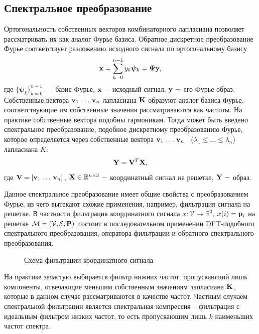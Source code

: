\subsection{Спектральное преобразование}

Ортогональность собственных векторов комбинаторного лапласиана позволяет рассматривать их как аналог Фурье базиса.  Обратное дискретное преобразование Фурье соответствует разложению исходного сигнала по ортогональному базису 
	$$\textbf{x} = \sum \limits _{k=0}^{n-1} y_k \bm{\psi}_k = \bm{\Psi} \textbf{y},$$ 
где $\{ \bm{\psi}_k\}_{k=0}^{n-1} ~- $ базис Фурье, $\textbf{x} ~- $ исходный сигнал, $\textbf{y} ~- $ его Фурье образ.
Собственные вектора $\textbf{v}_1 \, \dots \, \textbf{v}_n$ лапласиана $\textbf{K}$ образуют аналог базиса Фурье, соответствующие им собственные значения рассматриваются как частоты.
На практике собственные вектора подобны гармоникам.
Тогда может быть введено спектральное преобразование, подобное дискретному преобразованию Фурье, которое определяется через собственные вектора $\textbf{v}_1 \, \dots \, \textbf{v}_n$  \, ($\lambda_1 \le \dots \le \lambda_n$) лапласиана $K$:
	$$\textbf{Y} = \textbf{V}^T \textbf{X},$$
где $\textbf{V} = [\textbf{v}_1 \, \dots \, \textbf{v}_n]$, $\textbf{X} \in \mathbb{R}^{n \times 3} ~- $ координатный сигнал на решетке, $\textbf{Y} ~- $ образ.

Данное спектральное преобразование имеет общие свойства с преобразованием Фурье, из чего вытекают схожие применения, например, фильтрация сигнала на решетке.
В частности фильтрация координатного сигнала $x: \mathcal{V} \to \mathbb{R}^3$, $x(i)=\textbf{p}_i$ на решетке $\mathcal{M}=(\mathcal{V}, \mathcal{E}, \textbf{P})$ состоит в последовательном применении DFT-подобного спектрального преобразования, оператора фильтрации и обратного спектрального преобразования.
\begin{figure}[!htb]
\caption{Схема фильтрации координатного сигнала}
\end{figure}
На практике зачастую выбирается фильтр нижних частот, пропускающий лишь компоненты, отвечающие меньшим собственным значениям лапласиана $\textbf{K}$, которые в данном случае рассматриваются в качестве частот.
Частным случаем спектральной фильтрации является спектральная компрессия -- фильтрация с идеальным фильтром низких частот, то есть пропускающим лишь $k$ наименьших частот спектра.

